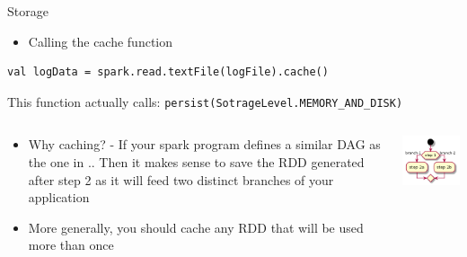 \documentclass[presentation, aspectratio=169]{beamer}
\begin{document}
\begin{frame}[label={sec:orgefd4038},fragile]{Storage}
 \begin{itemize}
\item Calling the cache function
\end{itemize}
\begin{verbatim}
val logData = spark.read.textFile(logFile).cache()
\end{verbatim}
This function actually calls: \texttt{persist(SotrageLevel.MEMORY\_AND\_DISK)}



\begin{columns}
\begin{column}{0.5\columnwidth}
\begin{itemize}
\item \alert{Why caching?} - If your spark program defines a similar DAG as the one in ..
Then it makes sense to save the RDD generated after step 2 as it will feed 
two distinct branches of your application
\item More generally, you should cache any RDD that will be used more than once
\end{itemize}
\end{column}

\begin{column}{0.5\columnwidth}
\begin{center}
\includegraphics[width=.9\linewidth]{dag.png}
\end{center}
\end{column}
\end{columns}
\end{frame}
\end{document}
